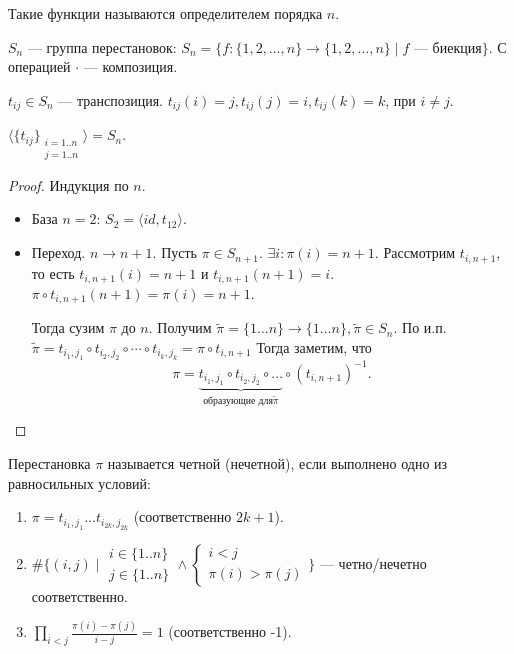 \begin{definition}
    Такие функции называются определителем порядка $n$.
\end{definition}

\begin{definition}
    $S_n$ --- группа перестановок:  $S_n = \{ f\! :\{1, 2,\ldots, n\} \to \{1, 2,\ldots, n\} \mid f\text{ --- биекция}\}$. С операцией $\cdot$ --- композиция.
\end{definition}
\begin{definition}
    $t_{ij} \in S_n$ --- транспозиция.  $t_{ij}(i) = j, t_{ij}(j) = i, t_{ij}(k) = k$, при $i \neq j$. 
\end{definition}
\begin{statement}
    $\langle\{t_{ij}\}_{\substack{i=1..n\\j=1..n}}\rangle = S_n$.
\end{statement}
\begin{proof}
    Индукция по $n$.
\begin{itemize}
    
    \item База $n=2$:  $S_2 = \langle id, t_{12}\rangle$. 
    \item Переход. $n \to n +1$.  Пусть $\pi \in S_{n+1}$.  $\exists i: \pi(i) = n + 1$. Рассмотрим  $t_{i, n+1}$, то есть $t_{i, n + 1}(i) = n + 1$ и $t_{i, n + 1}(n+1) = i$. $\pi \circ t_{i, n + 1}(n+1) = \pi(i) = n + 1$.

        Тогда сузим  $\pi$ до  $n$. Получим  $\widetilde{\pi}=\{1\ldots n\} \to \{1 \ldots n\}, \widetilde{\pi} \in S_n$. По и.п. $\widetilde{\pi} = t_{i_1,j_1} \circ t_{i_2, j_2} \circ \cdots \circ t_{i_{k}, j_k} = \pi \circ t_{i, n+1}$ Тогда заметим, что \[\pi = \underbrace{t_{i_1, j_1} \circ t_{i_2, j_2} \circ \ldots}_{\text{образующие для} \widetilde{\pi}} \circ (t_{i, n+1})^{-1}.\]
\end{itemize}
\end{proof}
\begin{definition}
    Перестановка $\pi$ называется четной (нечетной), если выполнено одно из равносильных условий:
    \begin{enumerate}
        \item $\pi = t_{i_1, j_1} \ldots t_{i_{2k}, j_{2k}}$ (соответственно $2k+1$).
        \item $\#\{(i, j) \mid \substack{i \in \{1..n\} \\ j \in \{1..n\}} \land \begin{cases} i < j \\ \pi(i) > \pi(j) \end{cases} \}$ --- четно/нечетно соответственно.
        \item  $\prod\limits_{i<j} \frac{\pi(i) - \pi(j)}{i-j} = 1$ (соответственно -1).
    \end{enumerate}

\end{definition}
